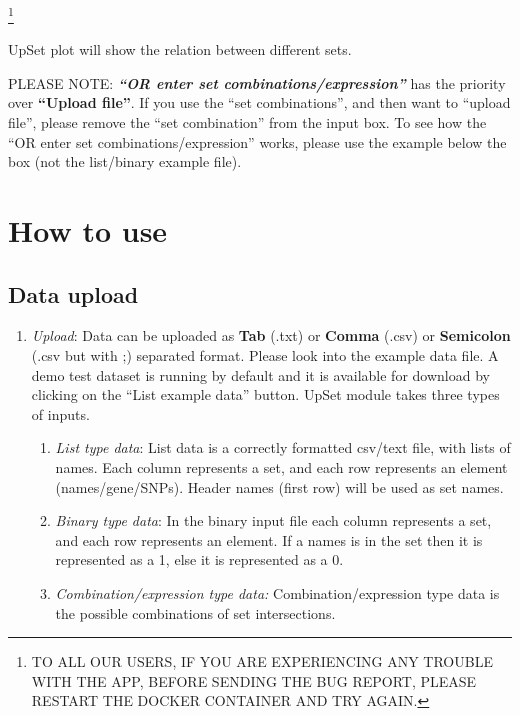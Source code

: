\documentclass[
  a4paper,
  oneside,
  open=any]{scrreport}
\providecommand{\tightlist}{%
  \setlength{\itemsep}{0pt}\setlength{\parskip}{0pt}}\usepackage{longtable,booktabs,array}
\begin{document}
\footnote{TO ALL OUR USERS, IF YOU ARE EXPERIENCING ANY TROUBLE WITH THE
  APP, BEFORE SENDING THE BUG REPORT, PLEASE RESTART THE DOCKER
  CONTAINER AND TRY AGAIN.}

UpSet plot will show the relation between different sets.

\begin{tcolorbox}[enhanced jigsaw, left=2mm, colback=white, breakable, leftrule=.75mm, coltitle=black, toprule=.15mm, rightrule=.15mm, colbacktitle=quarto-callout-note-color!10!white, title=\textcolor{quarto-callout-note-color}{\faInfo}\hspace{0.5em}{Note}, opacitybacktitle=0.6, colframe=quarto-callout-note-color-frame, bottomrule=.15mm, bottomtitle=1mm, toptitle=1mm, titlerule=0mm, opacityback=0, arc=.35mm]
PLEASE NOTE: \textbf{\emph{``OR enter set combinations/expression''}}
has the priority over \textbf{``Upload file''}. If you use the ``set
combinations'', and then want to ``upload file'', please remove the
``set combination'' from the input box. To see how the ``OR enter set
combinations/expression'' works, please use the example below the box
(not the list/binary example file).
\end{tcolorbox}

\hypertarget{how-to-use-10}{%
\section{How to use}\label{how-to-use-10}}

\hypertarget{data-upload-6}{%
\subsection{Data upload}\label{data-upload-6}}

\begin{enumerate}
\def\labelenumi{\arabic{enumi}.}
\item
  \emph{Upload}: Data can be uploaded as \textbf{Tab} (.txt) or
  \textbf{Comma} (.csv) or \textbf{Semicolon} (.csv but with ;)
  separated format. Please look into the example data file. A demo test
  dataset is running by default and it is available for download by
  clicking on the ``List example data'' button. UpSet module takes three
  types of inputs.

  \begin{enumerate}
  \def\labelenumii{\roman{enumii}.}
  \tightlist
  \item
    \emph{List type data}: List data is a correctly formatted csv/text
    file, with lists of names. Each column represents a set, and each
    row represents an element (names/gene/SNPs). Header names (first
    row) will be used as set names.
  \item
    \emph{Binary type data}: In the binary input file each column
    represents a set, and each row represents an element. If a names is
    in the set then it is represented as a 1, else it is represented as
    a 0.
  \item
    \emph{Combination/expression type data:} Combination/expression type
    data is the possible combinations of set intersections.
  \end{enumerate}
\end{enumerate}
\end{document}
